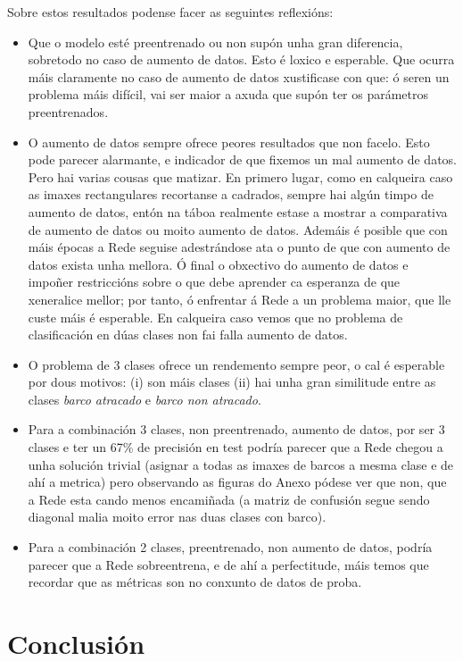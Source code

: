 \documentclass{article}
\begin{document}
Sobre estos resultados podense facer as seguintes reflexións:
\begin{itemize}
	\item Que o modelo esté preentrenado ou non supón unha gran diferencia, sobretodo no caso de aumento de datos. Esto é loxico e esperable. Que ocurra máis claramente no caso de aumento de datos xustificase con que: ó seren un problema máis difícil, vai ser maior a axuda que supón ter os parámetros preentrenados.
	\item O aumento de datos sempre ofrece peores resultados que non facelo. Esto pode parecer alarmante, e indicador de que fixemos un mal aumento de datos. Pero hai varias cousas que matizar. En primero lugar, como en calqueira caso as imaxes rectangulares recortanse a cadrados, sempre hai algún timpo de aumento de datos, entón na táboa realmente estase a mostrar a comparativa de aumento de datos ou moito aumento de datos. Ademáis é posible que con máis épocas a Rede seguise adestrándose ata o punto de que con aumento de datos exista unha mellora. Ó final o obxectivo do aumento de datos e impoñer restriccións sobre o que debe aprender ca esperanza de que xeneralice mellor; por tanto, ó enfrentar á Rede a un problema maior, que lle custe máis é esperable. En calqueira caso vemos que no problema de clasificación en dúas clases non fai falla aumento de datos.
	\item O problema de 3 clases ofrece un rendemento sempre peor, o cal é esperable por dous motivos: (i) son máis clases (ii) hai unha gran similitude entre as clases \emph{barco atracado} e \emph{barco non atracado}.
	\item Para a combinación 3 clases, non preentrenado, aumento de datos, por ser 3 clases e ter un 67\% de precisión en test podría parecer que a Rede chegou a unha solución trivial (asignar a todas as imaxes de barcos a mesma clase e de ahí a metrica) pero observando as figuras do Anexo pódese ver que non, que a Rede esta cando menos encamiñada (a matriz de confusión segue sendo diagonal malia moito error nas duas clases con barco).
	\item Para a combinación 2 clases, preentrenado, non aumento de datos, podría parecer que a Rede sobreentrena, e de ahí a perfectitude, máis temos que recordar que as métricas son no conxunto de datos de proba.
\end{itemize}


\section{Conclusión}
\end{document}
